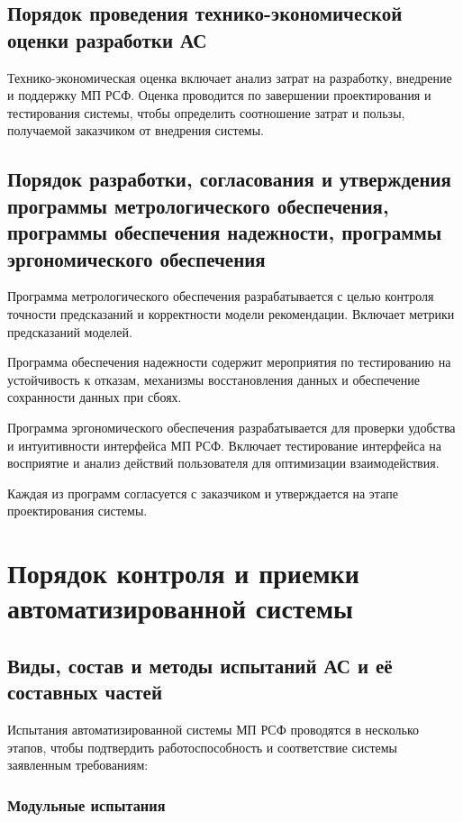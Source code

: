 \subsection{Порядок проведения технико-экономической оценки разработки АС}

Технико-экономическая оценка включает анализ затрат на разработку,
внедрение и поддержку МП РСФ.
Оценка проводится по завершении проектирования и тестирования системы,
чтобы определить соотношение затрат и пользы,
получаемой заказчиком от внедрения системы.

\subsection{Порядок разработки, согласования
	и утверждения программы метрологического обеспечения,
	программы обеспечения надежности, программы эргономического обеспечения}

Программа метрологического обеспечения
разрабатывается с целью контроля точности предсказаний
и корректности модели рекомендации.
Включает метрики предсказаний моделей.
  
Программа обеспечения надежности содержит мероприятия
по тестированию на устойчивость к отказам,
механизмы восстановления данных и обеспечение сохранности данных при сбоях.

Программа эргономического обеспечения разрабатывается
для проверки удобства и интуитивности интерфейса МП РСФ.
Включает тестирование интерфейса на восприятие
и анализ действий пользователя для оптимизации взаимодействия.

Каждая из программ согласуется с заказчиком
и утверждается на этапе проектирования системы.

\section{Порядок контроля и приемки автоматизированной системы}

\subsection{Виды, состав и методы испытаний АС и её составных частей}

Испытания автоматизированной системы МП РСФ проводятся в несколько этапов,
чтобы подтвердить работоспособность
и соответствие системы заявленным требованиям:

\subsubsection{Модульные испытания}

